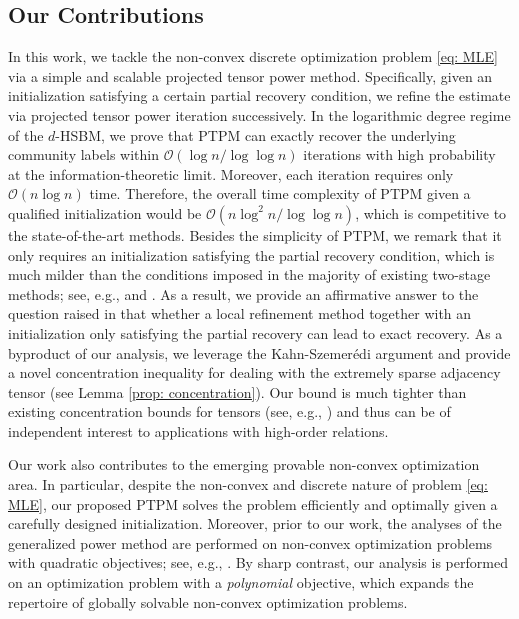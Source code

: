 \documentclass{article}
\theoremstyle{plain}
\theoremstyle{definition}
\theoremstyle{remark}
\newcommand{\OCal}{\mathcal{O}}
\begin{document}
\subsection{Our Contributions}
In this work, we tackle the non-convex discrete optimization problem \eqref{eq: MLE} via a simple and scalable projected tensor power method. Specifically, given an initialization satisfying a certain partial recovery condition, we refine the estimate via projected tensor power iteration successively. In the logarithmic degree regime of the $d$-HSBM, we prove that PTPM can exactly recover the underlying community labels within $\OCal(\log n/ \log \log n)$ iterations with high probability at the information-theoretic limit. Moreover, each iteration requires only $\OCal(n \log n)$ time. Therefore, the overall time complexity of PTPM given a qualified initialization would be $\OCal(n\log^2n/\log\log n)$, which is competitive to the state-of-the-art methods. Besides the simplicity of PTPM, we remark that it only requires an initialization satisfying the partial recovery condition, which is much milder than the conditions imposed in the majority of existing two-stage methods; see, e.g., \citet{chien2019minimax} and \citep{zhang2022exact}. As a result, we provide an affirmative answer to the question raised in \citet{abbe2017community,kim2018stochastic} that whether a local refinement method together with an initialization only satisfying the partial recovery can lead to exact recovery. 
As a byproduct of our analysis, we leverage the Kahn-Szemer{\'e}di argument and provide a novel concentration inequality for dealing with the extremely sparse adjacency tensor (see Lemma \ref{prop: concentration}). Our bound is much tighter than existing concentration bounds for tensors (see, e.g., \citet[Theorem 2.3; Remark 2.2; Lemma 6.1]{zhou2021sparse}) and thus can be of independent interest to applications with high-order relations.

Our work also contributes to the emerging provable non-convex optimization area. In particular, despite the non-convex and discrete nature of problem \eqref{eq: MLE}, our proposed PTPM solves the problem efficiently and optimally given a carefully designed initialization. Moreover, prior to our work, the analyses of the generalized power method are performed on non-convex optimization problems with quadratic objectives; see, e.g., \citet{boumal2016nonconvex,chen2018projected,zhong2018near,zhu2021orthogonal,wang2021non,araya2022seeded}. By sharp contrast, our analysis is performed on an optimization problem with a \emph{polynomial} objective, which expands the repertoire of globally solvable non-convex optimization problems.
\end{document}
